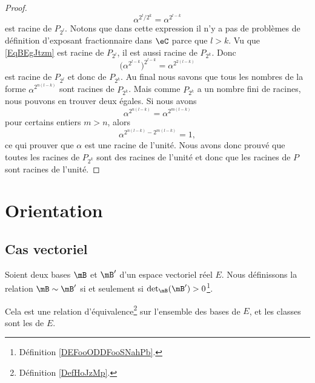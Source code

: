 \begin{proof}
    \begin{equation}    \label{EqBEgJtzm}
        \alpha^{2^l/2^k}=\alpha^{2^{l-k}}
    \end{equation}
    est racine de \( P_{2^l}\). Notons que dans cette expression il n'y a pas de problèmes de définition d'exposant fractionnaire dans \( \eC\) parce que \( l>k\). Vu que \eqref{EqBEgJtzm} est racine de \( P_{2^l}\), il est aussi racine de \( P_{2^k}\). Donc
    \begin{equation}
        \big( \alpha^{2^{l-k}} \big)^{2^{l-k}}=\alpha^{2^{2(l-k)}}
    \end{equation}
    est racine de \( P_{2^l}\) et donc de \( P_{2^k}\). Au final nous savons que tous les nombres de la forme \( \alpha^{2^{n(l-k)}}\) sont racines de \( P_{2^k}\). Mais comme \( P_{2^k}\) a un nombre fini de racines, nous pouvons en trouver deux égales. Si nous avons
    \begin{equation}
        \alpha^{2^{n(l-k)}}=\alpha^{2^{m(l-k)}}
    \end{equation}
    pour certains entiers \( m>n\), alors
    \begin{equation}
        \alpha^{2^{n(l-k)}-2^{m(l-k)}}=1,
    \end{equation}
    ce qui prouver que \( \alpha\) est une racine de l'unité. Nous avons donc prouvé que toutes les racines de \( P_{2^k}\) sont des racines de l'unité et donc que les racines de \( P\) sont racines de l'unité.
\end{proof}

\section{Orientation}

\subsection{Cas vectoriel}

\begin{propositionDef}        \label{DEFooNVRHooEBHUSu}
    Soient deux bases \( \mB\) et \( \mB'\) d'un espace vectoriel réel \( E\). Nous définissons la relation \( \mB\sim \mB'\) si et seulement si \( \det_{\mB}(\mB')>0\)\footnote{Définition \ref{DEFooODDFooSNahPb}.}.

    Cela est une relation d'équivalence\footnote{Définition \ref{DefHoJzMp}.} sur l'ensemble des bases de \( E\), et les classes sont les  de \( E\).
\end{propositionDef}

